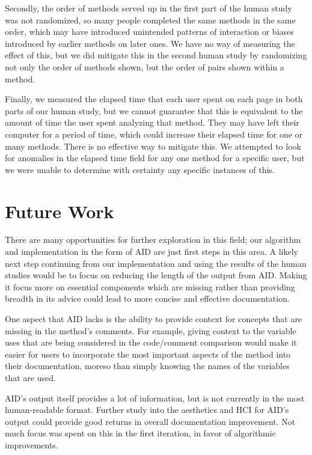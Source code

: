 \documentclass[preprint]{sigplanconf}
\begin{document}
Secondly, the order of methods served up in the first part of the human study was not randomized, so many people completed the same methods in the same order, which may have introduced unintended patterns of interaction or biases introduced by earlier methods on later ones. We have no way of measuring the effect of this, but we did mitigate this in the second human study by randomizing not only the order of methods shown, but the order of pairs shown within a method.

Finally, we measured the elapsed time that each user spent on each page in both parts of our human study, but we cannot guarantee that this is equivalent to the amount of time the user spent analyzing that method. They may have left their computer for a period of time, which could increase their elapsed time for one or many methods. There is no effective way to mitigate this. We attempted to look for anomalies in the elapsed time field for any one method for a specific user, but we were unable to determine with certainty any specific instances of this.

\section{Future Work}
There are many opportunities for further exploration in this field; our algorithm and implementation in the form of AID are just first steps in this area. A likely next step continuing from our implementation and using the results of the human studies would be to focus on reducing the length of the output from AID. Making it focus more on essential components which are missing rather than providing breadth in its advice could lead to more concise and effective documentation.

One aspect that AID lacks is the ability to provide context for concepts that are missing in the method's comments. For example, giving context to the variable uses that are being considered in the code/comment comparison would make it easier for users to incorporate the most important aspects of the method into their documentation, moreso than simply knowing the names of the variables that are used.

AID's output itself provides a lot of information, but is not currently in the most human-readable format. Further study into the aesthetics and HCI for AID's output could provide good returns in overall documentation improvement. Not much focus was spent on this in the first iteration, in favor of algorithmic improvements.
\end{document}

